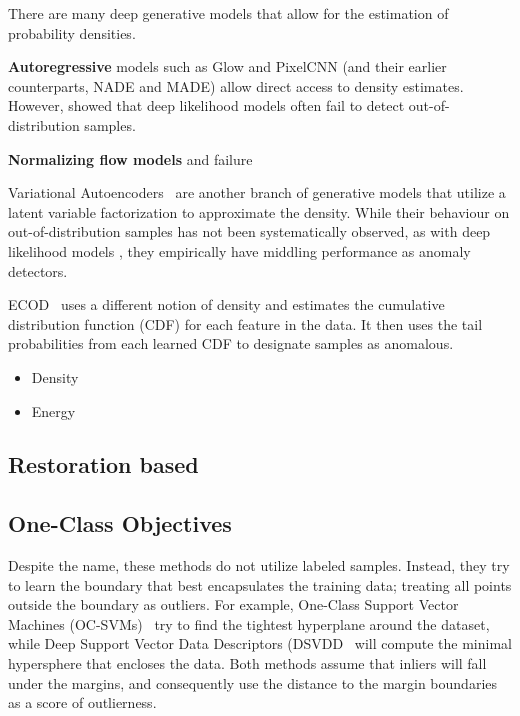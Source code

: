 There are many deep generative models that allow for the estimation of probability densities. 

\textbf{Autoregressive} models such as Glow and PixelCNN (and their earlier counterparts, NADE and MADE) allow direct access to density estimates. However, \cite{nalisnick2018do} showed that deep likelihood models often fail to detect out-of-distribution samples.

\textbf{Normalizing flow models} and failure


Variational Autoencoders~\cite{kingma2013auto} are another branch of generative models that utilize a latent variable factorization to approximate the density. While their behaviour on out-of-distribution samples has not been systematically observed, as with deep likelihood models , they empirically have middling performance as anomaly detectors.


ECOD~\cite{li_ecod_2022} uses a different notion of density and estimates the cumulative distribution function (CDF) for each feature in the data. It then uses the tail probabilities from each learned CDF to designate samples as anomalous.


\begin{itemize}
    \item Density 
    \item Energy
\end{itemize}

\subsection{Restoration based} 

\subsection{One-Class Objectives}

Despite the name, these methods do not utilize labeled samples. Instead, they try to learn the boundary that best encapsulates the training data; treating all points outside the boundary as outliers. For example, One-Class Support Vector Machines (OC-SVMs)~\cite{ocsvm} try to find the tightest hyperplane around the dataset, while Deep Support Vector Data Descriptors (DSVDD~\cite{pmlr-v80-ruff18a}  will compute the minimal hypersphere that encloses the data. Both methods assume that inliers will fall under the margins, and consequently use the distance to the margin boundaries as a score of outlierness. 

